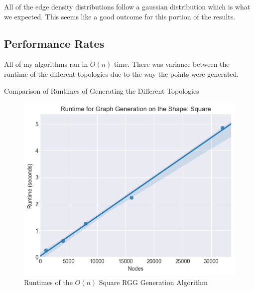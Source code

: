 \documentclass{article}
\begin{document}
  All of the edge density distributions follow a gaussian distribution which is what we expected.
  This seems like a good outcome for this portion of the results.
  \subsection{Performance Rates}
  All of my algorithms ran in $O(n)$ time.
  There was variance between the runtime of the different topologies due to the way the points were generated.
  \begin{center}
	  \begin{table}[H]
		  \caption{Comparison of Runtimes of Generating the Different Topologies}
	  \end{table}
  \end{center}

  \begin{figure}[H]
    \centering
    \includegraphics[width=1 \textwidth]{square/runtime/runtime_chart}
    \caption{Runtimes of the $O(n)$ Square RGG Generation Algorithm}
  \end{figure}
\end{document}
